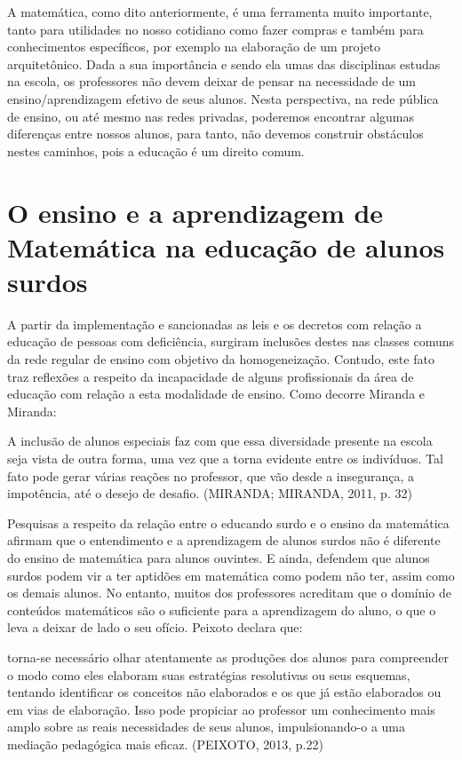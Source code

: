 \documentclass[brasil]{abnt}
\begin{document}
	A matemática, como dito anteriormente, é uma ferramenta muito importante, tanto para utilidades no nosso cotidiano como fazer compras e também para conhecimentos específicos, por exemplo na elaboração 
	de um projeto arquitetônico. Dada a sua importância e sendo ela umas das disciplinas estudas na escola, os professores não devem deixar de pensar na necessidade de um ensino/aprendizagem 
	efetivo de seus alunos. Nesta perspectiva, na rede pública de ensino, ou até mesmo nas redes privadas, poderemos encontrar algumas diferenças entre nossos alunos, para tanto, não devemos construir
	obstáculos nestes caminhos, pois a educação é um direito comum. 
	
					
\chapter{O ensino e a aprendizagem de Matemática na educação de alunos surdos}	
	A partir da implementação e sancionadas as leis e os decretos com relação a educação de pessoas com deficiência, surgiram inclusões destes nas classes comuns da rede regular de ensino com objetivo da 
	homogeneização. Contudo, este fato traz reflexões a respeito da incapacidade de alguns profissionais da área de educação com relação a esta modalidade de ensino. Como decorre Miranda e Miranda:
		
			\begin{citacao} A inclusão de alunos especiais faz com que essa diversidade presente na escola seja vista de outra forma, uma vez que a torna evidente entre os indivíduos. Tal fato pode gerar 
							várias reações no professor, que vão desde a insegurança, a impotência, até o desejo de desafio. (MIRANDA; MIRANDA, 2011, p. 32)   			
			\end{citacao}
						
	Pesquisas a respeito da relação entre o educando surdo e o ensino da matemática afirmam que o entendimento e a aprendizagem de alunos surdos não é diferente do ensino de matemática para alunos ouvintes. 
	E ainda, defendem que alunos surdos podem vir a ter aptidões em matemática como podem não ter, assim como os demais alunos. No entanto, muitos dos professores acreditam que o domínio de conteúdos 
	matemáticos são o suficiente para a aprendizagem do aluno, o que o leva a deixar de lado o seu ofício. Peixoto declara que:
	
		\begin{citacao}[...] torna-se necessário olhar atentamente as produções dos alunos para compreender o modo como eles elaboram suas estratégias resolutivas ou seus esquemas, tentando identificar 
						os conceitos não elaborados e os que já estão elaborados ou em vias de elaboração. Isso pode propiciar ao professor um conhecimento mais amplo sobre as reais necessidades de seus 
						alunos, impulsionando-o a uma mediação pedagógica mais eficaz. (PEIXOTO, 2013, p.22)
		\end{citacao}
	
\end{document}
